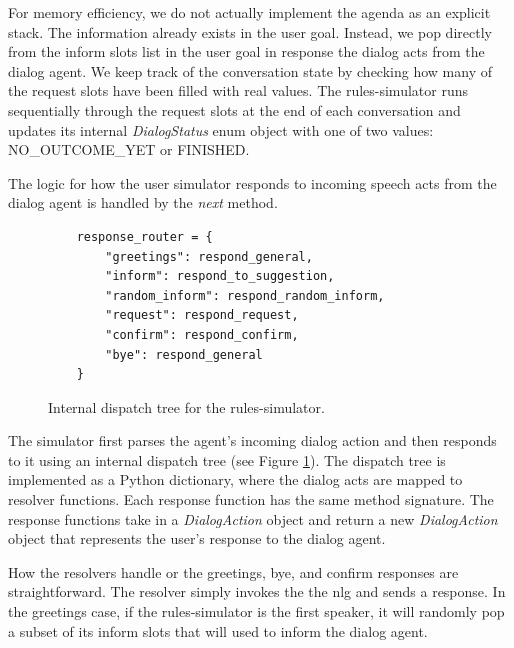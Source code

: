 For memory efficiency, we do not actually implement the agenda as an explicit stack. The information already exists in the user goal. Instead, we pop directly from the inform slots list in the user goal in response the dialog acts from the dialog agent. We keep track of the conversation state by checking how many of the request slots have been filled with real values. The rules-simulator runs sequentially through the request slots at the end of each conversation and updates its internal\textit{ DialogStatus} enum object with one of two values: NO\_OUTCOME\_YET or FINISHED.

The logic for how the user simulator responds to incoming speech acts from the dialog agent is handled by the \textit{next} method. 

\begin{figure}[h!]
	\label{fig:dispatch_tree}
	\begin{lstlisting}
	response_router = { 
		"greetings": respond_general,
		"inform": respond_to_suggestion,
		"random_inform": respond_random_inform,
		"request": respond_request,
		"confirm": respond_confirm,
		"bye": respond_general
	}	
	\end{lstlisting}
	\caption{ Internal dispatch tree for the rules-simulator. }
\end{figure}

The simulator first parses the agent's incoming dialog action and then responds to it using an internal dispatch tree (see Figure \ref{fig:dispatch_tree}). The dispatch tree is implemented as a Python dictionary, where the dialog acts are mapped to resolver functions. Each response function has the same method signature.  The response functions take in a \textit{DialogAction} object and return a new \textit{DialogAction} object that represents the user's response to the dialog agent. 
 
How the resolvers handle or the greetings, bye, and confirm responses are straightforward. The resolver  simply invokes the the nlg and sends a response. In the greetings case, if the rules-simulator is the first speaker, it will randomly pop a subset of its inform slots that will used to inform the dialog agent. 

